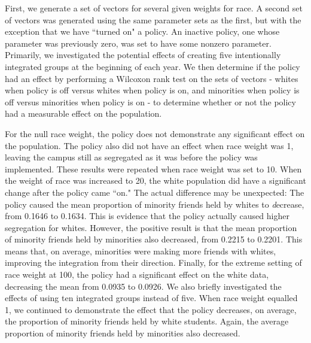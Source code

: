 
First, we generate a set of vectors for several given weights for race. A second set of vectors was generated using the same parameter sets as the first, but with the 
exception that we have ``turned on" a policy. An inactive policy, one whose parameter was previously zero, was set to have some nonzero parameter. Primarily, 
we investigated the potential effects of creating five intentionally integrated groups at the beginning of each year. We then 
determine if the policy had an effect by performing a Wilcoxon rank test on the sets of vectors - whites when policy is off versus whites when policy is on, and minorities when policy is off 
versus minorities when policy is on - to determine whether or not the policy had a measurable effect on the population.

For the null race weight, the policy does not demonstrate any significant effect on the population. The policy also did not have an effect when race weight was 1, leaving 
the campus still as segregated as it was before the policy was implemented. These results were repeated when race weight was 
set to 10. When the weight of race was increased to 20, the white population did have a significant change after the policy came ``on." The actual difference may 
be unexpected: The policy caused the mean proportion of minority friends held by whites to {\emph decrease}, from 0.1646 to 0.1634. This is evidence that the policy actually caused higher segregation for whites. However, the positive result is that the mean proportion of minority friends held by minorities also decreased, from 0.2215 to 0.2201. This means that, on 
average, minorities were making more friends with whites, improving the integration from their direction. Finally, for the extreme setting of race weight at 100, the policy had a significant effect on the white data, decreasing the mean from 0.0935 to 0.0926. We also briefly investigated the effects of using ten integrated groups instead of five. When race weight equalled 1, we continued to demonstrate the effect that the policy decreases, on average, the proportion of minority friends held by white students. Again, the average proportion of minority friends 
held by minorities also decreased.


